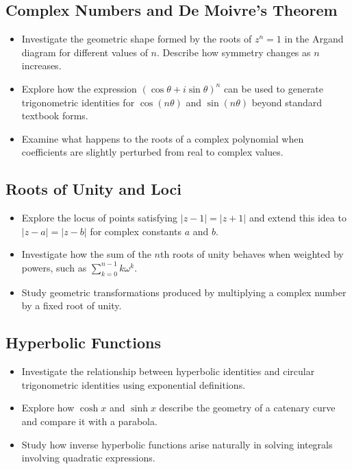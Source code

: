 \documentclass[12pt, a4paper]{book}
\begin{document}
\subsection*{Complex Numbers and De Moivre's Theorem}
\begin{itemize}
\item Investigate the geometric shape formed by the roots of $z^n = 1$ in the Argand diagram for different values of $n$. Describe how symmetry changes as $n$ increases.
\item Explore how the expression $(\cos \theta + i \sin \theta)^n$ can be used to generate trigonometric identities for $\cos(n\theta)$ and $\sin(n\theta)$ beyond standard textbook forms.
\item Examine what happens to the roots of a complex polynomial when coefficients are slightly perturbed from real to complex values.
\end{itemize}

\subsection*{Roots of Unity and Loci}
\begin{itemize}
\item Explore the locus of points satisfying $|z - 1| = |z + 1|$ and extend this idea to $|z - a| = |z - b|$ for complex constants $a$ and $b$.
\item Investigate how the sum of the $n$th roots of unity behaves when weighted by powers, such as $\sum_{k=0}^{n-1} k \omega^k$.
\item Study geometric transformations produced by multiplying a complex number by a fixed root of unity.
\end{itemize}

\subsection*{Hyperbolic Functions}
\begin{itemize}
\item Investigate the relationship between hyperbolic identities and circular trigonometric identities using exponential definitions.
\item Explore how $\cosh x$ and $\sinh x$ describe the geometry of a catenary curve and compare it with a parabola.
\item Study how inverse hyperbolic functions arise naturally in solving integrals involving quadratic expressions.
\end{itemize}
\end{document}
